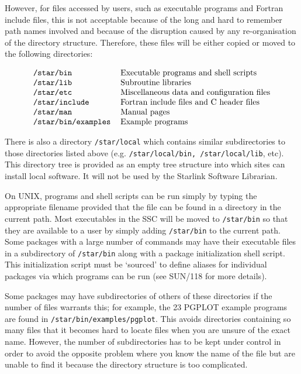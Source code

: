 However, for files accessed by users, such as executable programs
and Fortran include files, this is not acceptable because of the long and hard
to remember path names involved and because of the disruption caused by any
re-organisation of the directory structure. Therefore, these files will be
either copied or moved to the following directories:

{\renewcommand{\arraystretch}{1.5}
\[\begin{tabular}{ll}
\tt/star/bin & Executable programs and shell scripts\\
\tt/star/lib & Subroutine libraries\\
\tt/star/etc & Miscellaneous data and configuration files\\
\tt/star/include & Fortran include files and C header files\\
\tt/star/man & Manual pages\\
\tt/star/bin/examples & Example programs
\end{tabular}\]}


There is also a directory {\tt /star/local} which contains similar
subdirectories to those directories listed above
(e.g. {\tt /star/local/bin,
/star/local/lib}, etc). This directory tree is provided as an empty
tree structure into which sites can install local software.
It will not be used by
the Starlink Software Librarian.

On UNIX, programs and shell scripts can be run simply by typing the
appropriate filename
provided that the file can be found in a directory in
the current path.  Most executables in
the SSC will be moved to {\tt /star/bin} so that they are available to a user
by simply adding {\tt /star/bin} to the current path. Some packages with a
large number of commands may have their executable files in a subdirectory of
{\tt/star/bin} along with a package initialization shell script.
This initialization script must be `sourced' to define aliases for
individual packages via which programs can be run (see SUN/118 for more
details).

Some packages may have subdirectories of others of these directories
if the number of files warrants this; for example, the 23 PGPLOT example programs
are found in {\tt/star/bin/examples/pgplot}. This avoids directories containing
so many files that it becomes hard to locate files when you are unsure of the
exact name. However, the number of subdirectories has to be kept under control
in order to avoid the opposite problem where you know the name of the file
but are unable to find it because the directory structure is too complicated.

